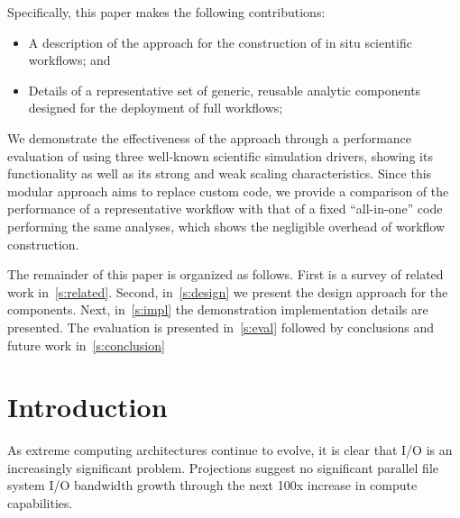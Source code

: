 
Specifically, this paper makes the following contributions:
\begin{itemize}
\item A description of the \sys approach
  for the construction
  of in situ scientific workflows; and
\item Details of a representative set of \insitu generic,
  reusable analytic components designed for the deployment
  of full \sys workflows;
\end{itemize}

We demonstrate the effectiveness of the approach through
a performance evaluation of \sys using three
well-known scientific simulation
drivers, showing its functionality as well as
its strong and weak scaling
characteristics. Since this modular approach aims to
replace custom code, we provide a comparison of
the performance of a representative \sys workflow with
that of a fixed ``all-in-one'' code performing the same analyses,
which shows the negligible overhead of \sys workflow construction.

The remainder of this paper is organized as follows.
First is a survey of related
work in~\autoref{s:related}.
Second, in~\autoref{s:design} we present the design
approach for the components.
Next, in~\autoref{s:impl} the demonstration implementation details
are presented. The evaluation is presented in~\autoref{s:eval} followed
by conclusions and future work in~\autoref{s:conclusion}


\section{Introduction}
\label{s:intro}

As extreme computing architectures continue to evolve, it is 
clear that I/O is an increasingly significant problem.  Projections suggest no
significant parallel file system I/O bandwidth growth through the next 100x
increase in compute capabilities.

